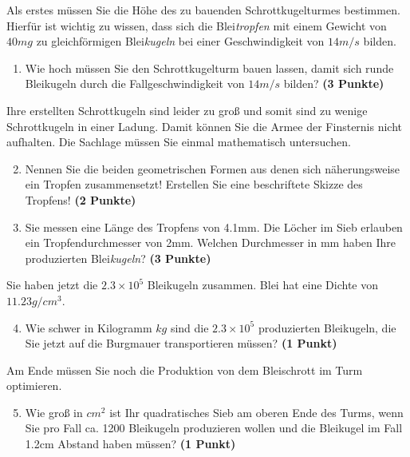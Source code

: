 \documentclass[a4paper, 9pt]{scrartcl}\usepackage[]{graphicx}\usepackage[]{xcolor}
\begin{document}
Als erstes m{\"u}ssen Sie die H{\"o}he des zu bauenden Schrottkugelturmes
bestimmen. Hierf{\"u}r ist wichtig zu wissen, dass sich die
Blei\textit{tropfen} mit einem Gewicht von $40mg$ zu
gleichf{\"o}rmigen Blei\textit{kugeln} bei einer Geschwindigkeit von
$14m/s$ bilden.

\begin{enumerate}
\item Wie hoch m{\"u}ssen Sie den Schrottkugelturm bauen lassen, damit sich
  runde Bleikugeln durch die Fallgeschwindigkeit von $14m/s$ bilden?
  \textbf{(3 Punkte)}
\end{enumerate}

Ihre erstellten Schrottkugeln sind leider zu gro{\ss} und somit sind zu wenige
Schrottkugeln in einer Ladung. Damit k{\"o}nnen Sie die Armee der Finsternis
nicht aufhalten. Die Sachlage m{\"u}ssen Sie einmal mathematisch untersuchen.

\begin{enumerate}
  \setcounter{enumi}{1}
\item Nennen Sie die beiden geometrischen Formen aus denen sich
  n{\"a}herungsweise ein Tropfen zusammensetzt! Erstellen Sie eine beschriftete 
  Skizze des Tropfens!
  \textbf{(2 Punkte)}
\item Sie messen eine L{\"a}nge des Tropfens von 4.1mm. Die L{\"o}cher
  im Sieb erlauben ein Tropfendurchmesser von 2mm. Welchen
  Durchmesser in mm haben Ihre produzierten Blei\textit{kugeln}?  \textbf{(3 Punkte)}
\end{enumerate}

Sie haben jetzt die \ensuremath{2.3\times 10^{5}} Bleikugeln zusammen. Blei hat eine Dichte
von $11.23g/cm^3$.

\begin{enumerate}
  \setcounter{enumi}{3}
\item Wie schwer in Kilogramm $kg$ sind die \ensuremath{2.3\times 10^{5}} produzierten
  Bleikugeln, die Sie jetzt auf die Burgmauer transportieren m{\"u}ssen?
  \textbf{(1 Punkt)}
\end{enumerate}

Am Ende m{\"u}ssen Sie noch die Produktion von dem Bleischrott im Turm optimieren.

\begin{enumerate}
  \setcounter{enumi}{4}
\item Wie gro{\ss} in $cm^2$ ist Ihr quadratisches Sieb am oberen Ende des Turms,
  wenn Sie pro Fall ca. 1200 Bleikugeln produzieren wollen und
  die Bleikugel im Fall 1.2cm Abstand haben m{\"u}ssen?  \textbf{(1
    Punkt)}
\end{enumerate}
 
\end{document}
